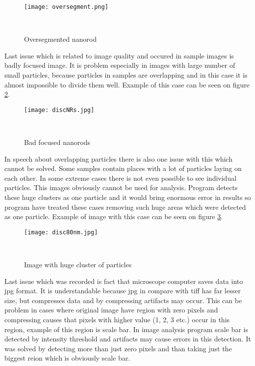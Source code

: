 \begin{figure}[h!]
\begin{center}
    \texttt{[image: oversegment.png]}
    \caption{Oversegmented nanorod}~\label{fig:oversegment}
\end{center}
\end{figure}

Last issue which is related to image quality and occured in sample images is badly focused image. It is problem especially in images with large number of small particles, because particles in samples are overlapping and in this case it is almost impossible to divide them well. Example of this case can be seen on figure \ref{fig:bad_focus}.

\begin{figure}[h!]
\begin{center}
    \texttt{[image: discNRs.jpg]}
    \caption{Bad focused nanorods}~\label{fig:bad_focus}
\end{center}
\end{figure}

In speech about overlapping particles there is also one issue with this which cannot be solved. Some samples contain places with a lot of particles laying on each other. In some extreme cases there is not even possible to see individual particles. This images obviously cannot be used for analysis. Program detects these huge clusters as one particle and it would bring enormous error in results so program have treated these cases removing such huge areas which were detected as one particle. Example of image with this case can be seen on figure \ref{fig:big_spot}.

\begin{figure}[h!]
\begin{center}
    \texttt{[image: disc80nm.jpg]}
    \caption{Image with huge cluster of particles}~\label{fig:big_spot}
\end{center}
\end{figure}

Last issue which was recorded is fact that microscope computer saves data into jpg format. It is understandable because jpg in compare with tiff has far lesser size, but compresses data and by compressing artifacts may occur. This can be problem in cases where original image have region with zero pixels and compressing causes that pixels with higher value (1, 2, 3 etc.) occur in this region, example of this region is scale bar. In image analysis program scale bar is detected by intensity threshold and artifacts may cause errors in this detection. It was solved by detecting more than just zero pixels and than taking just the biggest reion which is obviously scale bar.

